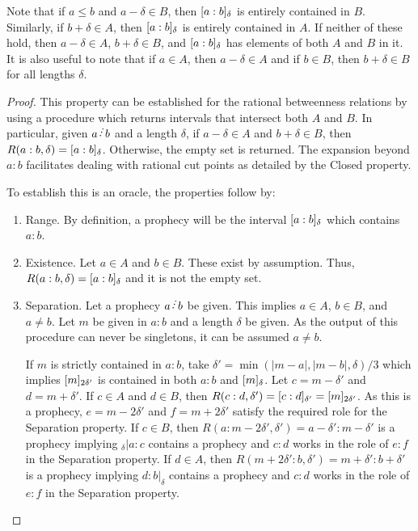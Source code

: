 \documentclass[12pt]{article}
\begin{document}
Note that if $a \leq b$ and $a-\delta \in B$, then $\halo{a:b}$ is entirely contained in $B$. Similarly, if $b + \delta \in A$, then $\halo{a:b}$ is entirely contained in $A$. If neither of these hold, then $a-\delta \in A$, $b+\delta \in B$, and $\halo{a:b}$ has elements of both $A$ and $B$ in it. It is also useful to note that if $a \in A$, then $a-\delta \in A$ and if $b \in B$, then $b+\delta \in B$ for all lengths $\delta$.

\begin{proof}
This property can be established for the rational betweenness relations by using a procedure which returns intervals that intersect both $A$ and $B$. In particular, given $a \lte b$ and a length $\delta$, if $a-\delta \in A$ and $b+\delta \in B$, then $R(a:b, \delta) = \halo{a:b}$. Otherwise, the empty set is returned. The expansion beyond $a:b$ facilitates dealing with rational cut points as detailed by the Closed property. 

To establish this is an oracle, the properties follow by: 
\begin{enumerate}
    \item Range. By definition, a prophecy will be the interval $\halo{a:b}$ which contains $a:b$. 
    \item Existence. Let $a \in A$ and $b \in B$. These exist by assumption. Thus, $R(a:b, \delta)= \halo{a:b}$  and it is not the empty set.
    \item Separation. Let a prophecy $a \lte b$ be given. This implies $a \in A$, $b \in B$, and $a \neq b$. Let $m$ be given in $a:b$ and a length $\delta$ be given. As the output of this procedure can never be singletons, it can be assumed $a \neq b$.
    
    If $m$ is strictly contained in $a:b$, take $\delta'= \min(|m-a|, |m-b|, \delta)/3$ which implies $\halo[2\delta']{m}$ is contained in both $a:b$ and $\halo{m}$.  Let $c = m-\delta'$ and $d=m+\delta'$. If $c \in A$ and $d \in B$, then $R(c:d, \delta') = \halo[\delta']{c:d} = \halo[2 \delta']{m}$. As this is a prophecy, $e = m - 2 \delta'$ and $f = m + 2 \delta'$ satisfy the required role for the Separation property. If $ c\in B$, then $R(a:m-2\delta', \delta') = a-\delta':m-\delta'$ is a prophecy implying ${}_\delta| a : c$ contains a prophecy and $c:d$ works in the role of $e:f$ in the Separation property. If $d \in A$, then $R(m+2\delta':b, \delta') = m+\delta':b+\delta'$ is a prophecy implying $d:b|_{\delta}$ contains a prophecy and $c:d$ works in the role of $e:f$ in the Separation property. 


\end{enumerate}
\end{proof}
\end{document}
